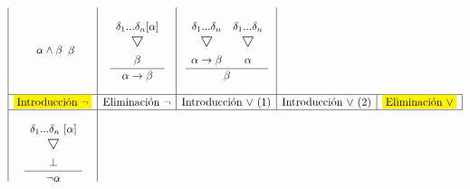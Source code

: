 \documentclass[a4paper, 12pt]{article}
\newcommand\triangulo{\scaleobj{1.3}{\bigtriangledown}}
\begin{document}
\begin{equation*}
\begin{array}{|c|c|c|c|c|}
\begin{matrix}
{\begin{matrix}
\begin{array}{c}
        \alpha \wedge \beta
      \end{array} \\
    \end{matrix}}{\beta}
\end{matrix}
&
\begin{matrix}
  \\
  \cfrac{
    \begin{matrix}
      \begin{array}{c}
        \delta_1 ... \delta_n [\alpha]\\
          \triangulo \vspace{2mm}\\
            \beta
      \end{array} \\
    \end{matrix}}{\alpha \rightarrow \beta}
  \\
  \ 
\end{matrix}
&
\begin{matrix}
  \cfrac{
    \begin{matrix}
      \begin{array}{cc}
      \ \\
        \delta_1 ... \delta_n & \delta_1 ... \delta_n \\
        \triangulo & \triangulo \vspace{2mm}\\
        \alpha \rightarrow \beta & \alpha
      \end{array} \\
    \end{matrix}}{\beta} \\
  \ 
\end{matrix}
\\ \hline
    \colorbox{yellow}{Introducción $\neg$} & 
    \text{Eliminación $\neg$} &
    \text{Introducción $\vee$ (1)} &
    \text{Introducción $\vee$ (2)} &
    \colorbox{yellow}{Eliminación $\vee$}
\\ \hline
\begin{matrix}
  \\
  \cfrac{
    \begin{matrix}
      \begin{array}{c}
        \delta_1 ... \delta_n \ [\alpha]\\
          \triangulo \vspace{2mm}\\
        \bot
      \end{array} \\
    \end{matrix}}{\neg \alpha}

\end{matrix}
\end{array}
\end{equation*}
\end{document}
